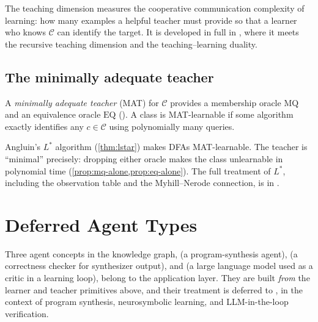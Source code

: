 The teaching dimension measures the cooperative communication complexity of learning: how many examples a helpful teacher must provide so that a learner who knows $\mathcal{C}$ can identify the target. It is developed in full in , where it meets the recursive teaching dimension and the teaching--learning duality.

\subsection{The minimally adequate teacher}

\begin{defn}
\label{def:mat-agents}
A \emph{minimally adequate teacher} (MAT) for $\mathcal{C}$ provides a membership oracle $\mathrm{MQ}$ and an equivalence oracle $\mathrm{EQ}$ (). A class is MAT-learnable if some algorithm exactly identifies any $c \in \mathcal{C}$ using polynomially many queries.
\end{defn}

Angluin's $L^\ast$ algorithm (\cref{thm:lstar}) makes DFAs MAT-learnable. The teacher is ``minimal'' precisely: dropping either oracle makes the class unlearnable in polynomial time (\cref{prop:mq-alone,prop:eq-alone}). The full treatment of $L^\ast$, including the observation table and the Myhill--Nerode connection, is in .


\section{Deferred Agent Types}
\label{sec:deferred}

Three agent concepts in the knowledge graph,  (a program-synthesis agent),  (a correctness checker for synthesizer output), and  (a large language model used as a critic in a learning loop), belong to the application layer. They are built \emph{from} the learner and teacher primitives above, and their treatment is deferred to , in the context of program synthesis, neurosymbolic learning, and LLM-in-the-loop verification.


